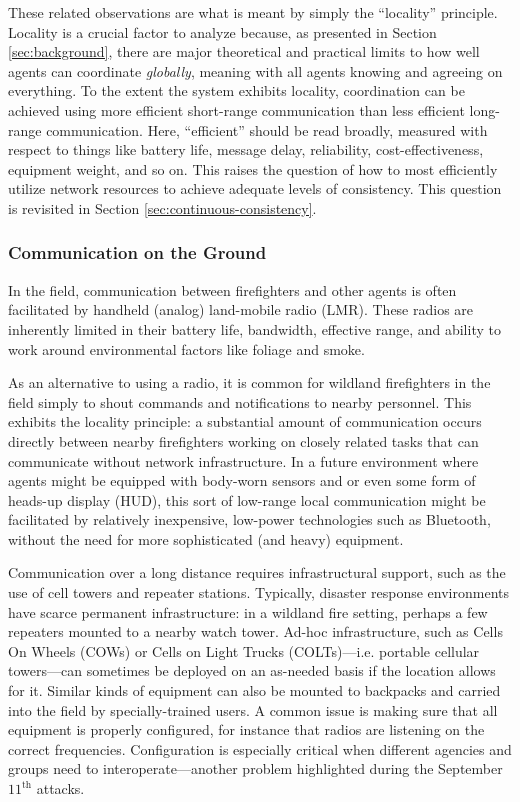 \documentclass[]             %
{NASA}                       %
\theoremstyle{definition}
\begin{document}
These related observations are what is meant by simply the
``locality'' principle. Locality is a crucial factor to analyze
because, as presented in Section \ref{sec:background}, there are major
theoretical and practical limits to how well agents can coordinate
\emph{globally}, meaning with all agents knowing and agreeing on
everything. To the extent the system exhibits locality, coordination
can be achieved using more efficient short-range communication than
less efficient long-range communication. Here, ``efficient'' should be
read broadly, measured with respect to things like battery life,
message delay, reliability, cost-effectiveness, equipment weight, and
so on. This raises the question of how to most efficiently utilize
network resources to achieve adequate levels of consistency. This
question is revisited in Section \ref{sec:continuous-consistency}.

\subsubsection{Communication on the Ground}
\label{sssec:ground-communication}
In the field, communication between firefighters and other agents is
often facilitated by handheld (analog) land-mobile radio (LMR). These
radios are inherently limited in their battery life, bandwidth,
effective range, and ability to work around environmental factors like
foliage and smoke.

As an alternative to using a radio, it is common for wildland
firefighters in the field simply to shout commands and notifications
to nearby personnel. This exhibits the locality principle: a
substantial amount of communication occurs directly between nearby
firefighters working on closely related tasks that can communicate
without network infrastructure. In a future environment where agents
might be equipped with body-worn sensors and or even some form of
heads-up display (HUD), this sort of low-range local communication
might be facilitated by relatively inexpensive, low-power technologies
such as Bluetooth, without the need for more sophisticated (and heavy)
equipment.

Communication over a long distance requires infrastructural support,
such as the use of cell towers and repeater stations. Typically,
disaster response environments have scarce permanent infrastructure:
in a wildland fire setting, perhaps a few repeaters mounted to a
nearby watch tower. Ad-hoc infrastructure, such as Cells On Wheels
(COWs) or Cells on Light Trucks (COLTs)---i.e. portable cellular
towers---can sometimes be deployed on an as-needed basis if the
location allows for it. Similar kinds of equipment can also be mounted
to backpacks and carried into the field by specially-trained users. A
common issue is making sure that all equipment is properly configured,
for instance that radios are listening on the correct
frequencies. Configuration is especially critical when different
agencies and groups need to interoperate---another problem highlighted
during the September $11^\textrm{th}$ attacks.
\end{document}
